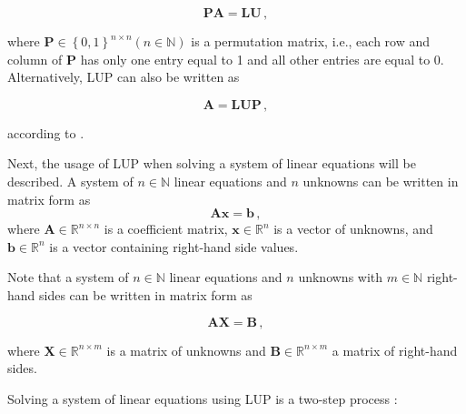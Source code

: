 \begin{equation}
	\mathbf{PA} = \mathbf{LU} \,,
	\label{Equation:theory->ICMPP->LUP->permuted-decomposition}
\end{equation}

where $\mathbf{P} \in \left\{0,1\right\}^{n \times n} \left( n \in \mathbb{N} \right)$ is a permutation matrix, i.e., each row and column of $\mathbf{P}$ has only one entry equal to 1 and all other entries are equal to 0.
Alternatively, LUP can also be written as

\begin{equation}
	\mathbf{A} = \mathbf{LUP} \,,
\end{equation}

according to  \cite{Okunev1997}.

Next, the usage of LUP when solving a system of linear equations will be described.
A system of $n \in \mathbb{N}$ linear equations and $n$ unknowns can be written in matrix form as
\begin{equation}
	\mathbf{Ax} = \mathbf{b} \,,
	\label{Equation:theory->ICMPP->LUP->system-linear-equations-1rhs}
\end{equation}
where $\mathbf{A} \in \mathbb{R}^{n\times n}$ is a coefficient matrix, $\mathbf{x} \in \mathbb{R}^n$ is a vector of unknowns, and $\mathbf{b} \in \mathbb{R}^n$ is a vector containing right-hand side values.

Note that a system of $n \in \mathbb{N}$ linear equations and $n$ unknowns with $m \in \mathbb{N}$ right-hand sides can be written in matrix form as

\begin{equation}
	\mathbf{AX} = \mathbf{B} \,,
	\label{Equation:theory->ICMPP->LUP->system-linear-equations-mrhs}
\end{equation}

where $\mathbf{X} \in \mathbb{R}^{n\times m}$ is a matrix of unknowns and $\mathbf{B} \in \mathbb{R}^{n\times m}$ a matrix of right-hand sides.

Solving a system of linear equations using LUP is a two-step process \cite{Cejka2022}:

